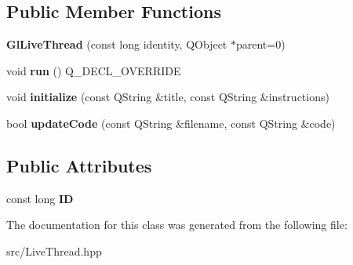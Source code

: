 \subsection*{Public Member Functions}
\begin{DoxyCompactItemize}
\item 
\hypertarget{classGlLiveThread_ae45231a4678f6368d071c43c787a3ca6}{{\bfseries Gl\+Live\+Thread} (const long identity, Q\+Object $\ast$parent=0)}\label{classGlLiveThread_ae45231a4678f6368d071c43c787a3ca6}

\item 
\hypertarget{classGlLiveThread_a54e22421d315b42b4712557d2930e3f9}{void {\bfseries run} () Q\+\_\+\+D\+E\+C\+L\+\_\+\+O\+V\+E\+R\+R\+I\+D\+E}\label{classGlLiveThread_a54e22421d315b42b4712557d2930e3f9}

\item 
\hypertarget{classGlLiveThread_a8aa094ecb107803bf9e0ab25ab5b9336}{void {\bfseries initialize} (const Q\+String \&title, const Q\+String \&instructions)}\label{classGlLiveThread_a8aa094ecb107803bf9e0ab25ab5b9336}

\item 
\hypertarget{classGlLiveThread_acae31626259ea26aad1c09ebb907d18e}{bool {\bfseries update\+Code} (const Q\+String \&filename, const Q\+String \&code)}\label{classGlLiveThread_acae31626259ea26aad1c09ebb907d18e}

\end{DoxyCompactItemize}
\subsection*{Public Attributes}
\begin{DoxyCompactItemize}
\item 
\hypertarget{classLiveThread_a5cfdefd7574fb1f34bbe1d21b5e3c1d8}{const long {\bfseries I\+D}}\label{classLiveThread_a5cfdefd7574fb1f34bbe1d21b5e3c1d8}

\end{DoxyCompactItemize}


The documentation for this class was generated from the following file\+:\begin{DoxyCompactItemize}
\item 
src/Live\+Thread.\+hpp\end{DoxyCompactItemize}
